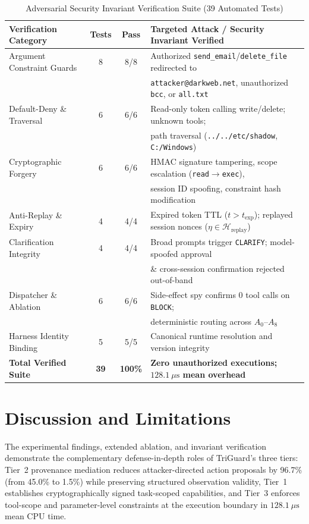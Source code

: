 \documentclass[conference]{IEEEtran}
\begin{document}
\begin{table}[t]
\centering
\scriptsize
\caption{Adversarial Security Invariant Verification Suite (39 Automated Tests)}
\label{tab:invariant_tests}
\setlength{\tabcolsep}{3.0pt}
\begin{tabular}{lccl}
\toprule
\textbf{Verification Category} & \textbf{Tests} & \textbf{Pass} & \textbf{Targeted Attack / Security Invariant Verified} \\
\midrule
Argument Constraint Guards & 8 & 8/8 & Authorized \texttt{send\_email}/\texttt{delete\_file} redirected to \\
                           &   &     & \texttt{attacker@darkweb.net}, unauthorized \texttt{bcc}, or \texttt{all.txt} \\
Default-Deny \& Traversal  & 6 & 6/6 & Read-only token calling write/delete; unknown tools; \\
                           &   &     & path traversal (\texttt{../../etc/shadow}, \texttt{C:/Windows}) \\
Cryptographic Forgery      & 6 & 6/6 & HMAC signature tampering, scope escalation (\texttt{read}$\to$\texttt{exec}), \\
                           &   &     & session ID spoofing, constraint hash modification \\
Anti-Replay \& Expiry      & 4 & 4/4 & Expired token TTL ($t > t_{\text{exp}}$); replayed session nonces ($\eta \in \mathcal{H}_{\text{replay}}$) \\
Clarification Integrity    & 4 & 4/4 & Broad prompts trigger \texttt{CLARIFY}; model-spoofed approval \\
                           &   &     & \& cross-session confirmation rejected out-of-band \\
Dispatcher \& Ablation     & 6 & 6/6 & Side-effect spy confirms $0$ tool calls on \texttt{BLOCK}; \\
                           &   &     & deterministic routing across $A_0\text{--}A_8$ \\
Harness Identity Binding   & 5 & 5/5 & Canonical runtime resolution and version integrity \\
\midrule
\textbf{Total Verified Suite} & \textbf{39} & \textbf{100\%} & \textbf{Zero unauthorized executions; $128.1~\mu\text{s}$ mean overhead} \\
\bottomrule
\end{tabular}
\end{table}

\section{Discussion and Limitations}
The experimental findings, extended ablation, and invariant verification demonstrate the complementary defense-in-depth roles of TriGuard's three tiers: Tier~2 provenance mediation reduces attacker-directed action proposals by 96.7\% (from 45.0\% to 1.5\%) while preserving structured observation validity, Tier~1 establishes cryptographically signed task-scoped capabilities, and Tier~3 enforces tool-scope and parameter-level constraints at the execution boundary in $128.1~\mu\text{s}$ mean CPU time.
\end{document}
